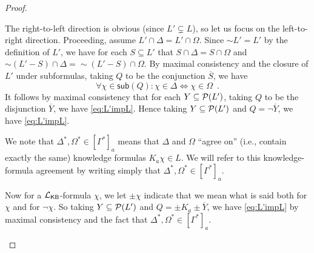 \documentclass[12pt]{article}
\theoremstyle{definition}
\newcommand{\pow}{{\cal P}}    %
\newcommand{\Lang}{{\cal L}}   %
\newcommand{\KB}{{\mathsf{KB}}}                     %
\begin{document}
\begin{proof}
\begin{itemize}
    The right-to-left direction is obvious (since $L'\subsetneq L$),
    so let us focus on the left-to-right direction.  Proceeding,
    assume $L'\cap\Delta=L'\cap\Omega$. Since ${\sim}L'=L'$ by the
    definition of $L'$, we have for each $S\subseteq L'$ that
    $S\cap\Delta=S\cap\Omega$ and
    ${\sim}(L'-S)\cap\Delta={\sim}(L'-S)\cap\Omega$. By maximal
    consistency and the closure of $L'$ under subformulas, taking $Q$
    to be the conjunction $\overline S$, we have
    \begin{equation}
      \forall\chi\in\mathsf{sub}(Q):\chi\in\Delta \Leftrightarrow
      \chi\in\Omega\enspace.
      \label{eq:L'impL}
    \end{equation}
    It follows by maximal consistency that for each
    $Y\subseteq\pow(L')$, taking $Q$ to be the disjunction $\overline
    Y$, we have \eqref{eq:L'impL}.  Hence taking $Y\subseteq\pow(L')$
    and $Q=\lnot\overline Y$, we have \eqref{eq:L'impL}.

    We note that $\Delta^*,\Omega^*\in[\Gamma^*]_a$ means that
    $\Delta$ and $\Omega$ ``agree on'' (i.e., contain exactly the
    same) knowledge formulas $K_a\chi\in L$.  We will refer to this
    knowledge-formula agreement by writing simply that
    $\Delta^*,\Omega^*\in[\Gamma^*]_a$.

    Now for a $\Lang_\KB$-formula $\chi$, we let ${\pm}\chi$ indicate
    that we mean what is said both for $\chi$ and for $\lnot\chi$.  So
    taking $Y\subseteq\pow(L')$ and $Q={\pm}K_a{\pm}\overline Y$, we
    have \eqref{eq:L'impL} by maximal consistency and the fact that
    $\Delta^*,\Omega^*\in[\Gamma^*]_a$.
    

\end{itemize}
\end{proof}
\end{document}
